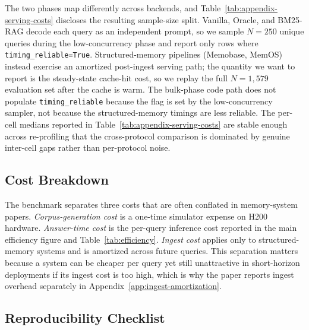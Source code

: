 The two phases map differently across backends, and Table~\ref{tab:appendix-serving-costs} discloses the resulting sample-size split. Vanilla, Oracle, and BM25-RAG decode each query as an independent prompt, so we sample $N{=}250$ unique queries during the low-concurrency phase and report only rows where \texttt{timing\_reliable=True}. Structured-memory pipelines (Memobase, MemOS) instead exercise an amortized post-ingest serving path; the quantity we want to report is the steady-state cache-hit cost, so we replay the full $N{=}1{,}579$ evaluation set after the cache is warm. The bulk-phase code path does not populate \texttt{timing\_reliable} because the flag is set by the low-concurrency sampler, not because the structured-memory timings are less reliable. The per-cell medians reported in Table~\ref{tab:appendix-serving-costs} are stable enough across re-profiling that the cross-protocol comparison is dominated by genuine inter-cell gaps rather than per-protocol noise.

\subsection{Cost Breakdown}
\label{app:cost}

The benchmark separates three costs that are often conflated in memory-system papers.
\emph{Corpus-generation cost} is a one-time simulator expense on H200 hardware.
\emph{Answer-time cost} is the per-query inference cost reported in the main efficiency figure and Table~\ref{tab:efficiency}.
\emph{Ingest cost} applies only to structured-memory systems and is amortized across future queries.
This separation matters because a system can be cheaper per query yet still unattractive in short-horizon deployments if its ingest cost is too high, which is why the paper reports ingest overhead separately in Appendix~\ref{app:ingest-amortization}.

\subsection{Reproducibility Checklist}
\label{app:reproducibility-checklist}


